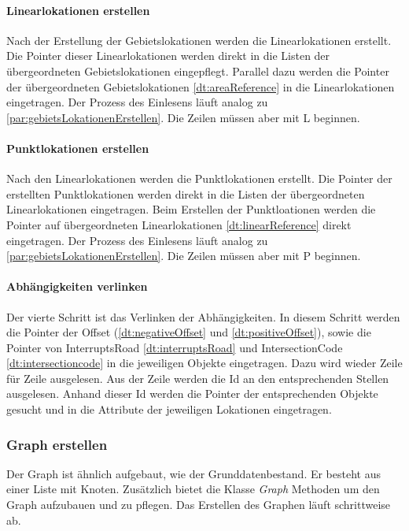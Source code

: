 \documentclass[12pt, a4paper, ngerman]{article}
\begin{document}
\paragraph{Linearlokationen erstellen}
Nach der Erstellung der Gebietslokationen werden die Linearlokationen erstellt. Die Pointer dieser Linearlokationen werden direkt in die Listen der übergeordneten Gebietslokationen eingepflegt. Parallel dazu werden die Pointer der übergeordneten Gebietslokationen \ref{dt:areaReference} in die Linearlokationen eingetragen. Der Prozess des Einlesens läuft analog zu \ref{par:gebietsLokationenErstellen}. Die Zeilen müssen aber mit \glqq L \grqq beginnen. 

\paragraph{Punktlokationen erstellen}
Nach den Linearlokationen werden die Punktlokationen erstellt. Die Pointer der erstellten Punktlokationen werden direkt in die Listen der übergeordneten Linearlokationen eingetragen. Beim Erstellen der Punktloationen werden die Pointer auf übergeordneten Linearlokationen \ref{dt:linearReference} direkt eingetragen. Der Prozess des Einlesens läuft analog zu \ref{par:gebietsLokationenErstellen}. Die Zeilen müssen aber mit \glqq P \grqq beginnen. 


\paragraph{Abhängigkeiten verlinken} 
Der vierte Schritt ist das Verlinken der Ab\-häng\-ig\-keit\-en. In diesem Schritt werden die Pointer der Offset (\ref{dt:negativeOffset} und \ref{dt:positiveOffset}), sowie die Pointer von InterruptsRoad \ref{dt:interruptsRoad} und IntersectionCode \ref{dt:intersectioncode} in die jeweiligen Objekte eingetragen. Dazu wird wieder Zeile für Zeile ausgelesen. Aus der Zeile werden die Id an den entsprechenden Stellen ausgelesen. Anhand dieser Id werden die Pointer der entsprechenden Objekte gesucht und in die Attribute der jeweiligen Lokationen eingetragen.

\subsubsection{Graph erstellen}
Der Graph ist ähnlich aufgebaut, wie der Grunddatenbestand. Er besteht aus einer Liste mit Knoten. Zusätzlich bietet die Klasse \textit{Graph}  Methoden um den Graph aufzubauen und zu pflegen. Das Erstellen des Graphen läuft schrittweise ab.
\end{document}

